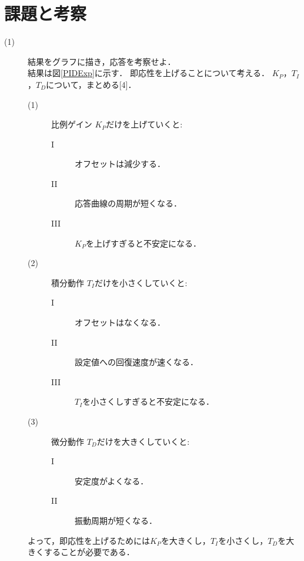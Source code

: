 \documentclass[12pt]{jsarticle}
\begin{document}
\section{課題と考察}
\begin{description}
\item[(1)]結果をグラフに描き，応答を考察せよ．\\

結果は図\ref{PIDExp}に示す．
即応性を上げることについて考える．
$K_P$，$T_I$，$T_D$について，まとめる[4]．
\begin{description}
\item[(1)] 比例ゲイン
  $K_P$だけを上げていくと:
  \begin{description}
  \item[I] オフセットは減少する．
  \item[II] 応答曲線の周期が短くなる．
  \item[III] $K_P$を上げすぎると不安定になる．
  \end{description}
\item[(2)] 積分動作
  $T_I$だけを小さくしていくと:
  \begin{description}
  \item[I] オフセットはなくなる．
  \item[II] 設定値への回復速度が速くなる．
  \item[III] $T_I$を小さくしすぎると不安定になる．
  \end{description}
\item[(3)] 微分動作
  $T_D$だけを大きくしていくと:
  \begin{description}
  \item[I] 安定度がよくなる．
  \item[II] 振動周期が短くなる．
  \end{description}
\end{description}
よって，即応性を上げるためには$K_P$を大きくし，$T_I$を小さくし，$T_D$を大きくすることが必要である．
\setcounter{page}{6}


\end{description}
\end{document}
